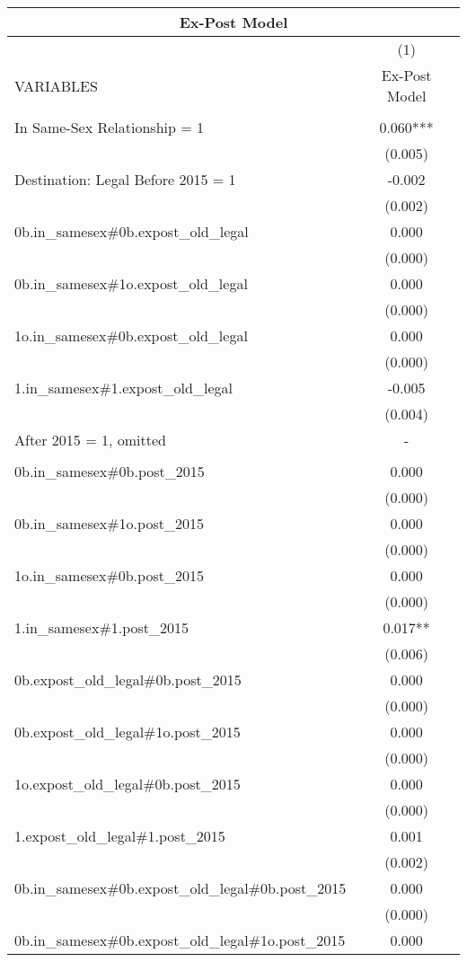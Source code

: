 \documentclass[]{article}
\begin{document}
\begin{tabular}{lc}
\multicolumn{2}{c}{Ex-Post Model} \\ \hline
 & (1) \\
VARIABLES & Ex-Post Model \\ \hline
 &  \\
In Same-Sex Relationship = 1 & 0.060*** \\
 & (0.005) \\
Destination: Legal Before 2015 = 1 & -0.002 \\
 & (0.002) \\
0b.in\_samesex\#0b.expost\_old\_legal & 0.000 \\
 & (0.000) \\
0b.in\_samesex\#1o.expost\_old\_legal & 0.000 \\
 & (0.000) \\
1o.in\_samesex\#0b.expost\_old\_legal & 0.000 \\
 & (0.000) \\
1.in\_samesex\#1.expost\_old\_legal & -0.005 \\
 & (0.004) \\
After 2015 = 1, omitted & - \\
 &  \\
0b.in\_samesex\#0b.post\_2015 & 0.000 \\
 & (0.000) \\
0b.in\_samesex\#1o.post\_2015 & 0.000 \\
 & (0.000) \\
1o.in\_samesex\#0b.post\_2015 & 0.000 \\
 & (0.000) \\
1.in\_samesex\#1.post\_2015 & 0.017** \\
 & (0.006) \\
0b.expost\_old\_legal\#0b.post\_2015 & 0.000 \\
 & (0.000) \\
0b.expost\_old\_legal\#1o.post\_2015 & 0.000 \\
 & (0.000) \\
1o.expost\_old\_legal\#0b.post\_2015 & 0.000 \\
 & (0.000) \\
1.expost\_old\_legal\#1.post\_2015 & 0.001 \\
 & (0.002) \\
0b.in\_samesex\#0b.expost\_old\_legal\#0b.post\_2015 & 0.000 \\
 & (0.000) \\
0b.in\_samesex\#0b.expost\_old\_legal\#1o.post\_2015 & 0.000 \\

\end{tabular}
\end{document}
